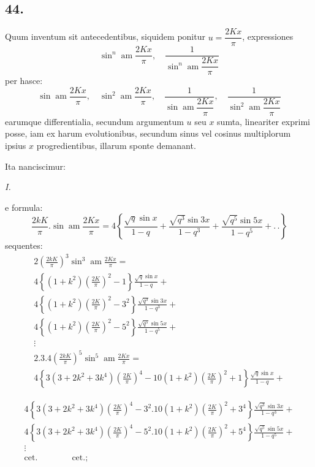 \documentclass{article}
\begin{document}
\subsection*{44.}

Quum inventum sit antecedentibus, siquidem ponitur $u=\dfrac{2Kx}{\pi}$, expressiones
\[
\sin^{n}\operatorname{am}\frac{2Kx}{\pi},\quad\frac{1}{\sin^{n}\operatorname{am}\dfrac{2Kx}{\pi}}
\]
per hasce:
\[
\sin\operatorname{am}\frac{2Kx}{\pi},\quad\sin^{2}\operatorname{am}\frac{2Kx}{\pi},\quad\frac{1}{\sin\operatorname{am}\dfrac{2Kx}{\pi}},\quad\frac{1}{\sin^{2}\operatorname{am}\dfrac{2Kx}{\pi}}
\]
earumque differentialia, secundum argumentum $u$ seu $x$ sumta, lineariter exprimi posse, iam ex harum evolutionibus, secundum sinus vel cosinus multiplorum ipsius $x$ progredientibus, illarum sponte demanant.

Ita nanciscimur:

\emph{I.}

e formula:
\[
\frac{2kK}{\pi}.\sin\operatorname{am}\frac{2Kx}{\pi}=4\left\{\frac{\sqrt{q}\sin x}{1-q}+\frac{\sqrt{q^{3}}\sin 3x}{1-q^{3}}+\frac{\sqrt{q^{5}}\sin 5x}{1-q^{5}}+.\,.\right\}
\]
sequentes:
\[
\begin{gathered}
2\left(\frac{2kK}{\pi}\right)^{3}\sin^{3}\operatorname{am}\frac{2Kx}{\pi}=\\[1.5ex]
4\left\{(1+k^{2})\left(\frac{2K}{\pi}\right)^{2}-1\right\}\frac{\sqrt{q}\sin x}{1-q}+\\[1.5ex]
4\left\{(1+k^{2})\left(\frac{2K}{\pi}\right)^{2}-3^{2}\right\}\frac{\sqrt{q^{3}}\sin 3x}{1-q^{3}}+\\[1.5ex]
4\left\{(1+k^{2})\left(\frac{2K}{\pi}\right)^{2}-5^{2}\right\}\frac{\sqrt{q^{5}}\sin 5x}{1-q^{5}}+\\[1.5ex]
\vdots\\[1.5ex]
2.3.4\left(\frac{2kK}{\pi}\right)^{5}\sin^{5}\operatorname{am}\frac{2Kx}{\pi}=\\[1.5ex]
4\left\{3(3+2k^{2}+3k^{4})\left(\frac{2K}{\pi}\right)^{4}-10(1+k^{2})\left(\frac{2K}{\pi}\right)^{2}+1\right\}\frac{\sqrt{q}\sin x}{1-q}+
\end{gathered}
\]

\[
\begin{gathered}
4\left\{3(3+2k^{2}+3k^{4})\left(\frac{2K}{\pi}\right)^{4}-3^{2}.10(1+k^{2})\left(\frac{2K}{\pi}\right)^{2}+3^{4}\right\}\frac{\sqrt{q^{3}}\sin 3x}{1-q^{3}}+\\[1.5ex]
4\left\{3(3+2k^{2}+3k^{4})\left(\frac{2K}{\pi}\right)^{4}-5^{2}.10(1+k^{2})\left(\frac{2K}{\pi}\right)^{2}+5^{4}\right\}\frac{\sqrt{q^{5}}\sin 5x}{1-q^{5}}+\\[1.5ex]
\vdots\\[1.5ex]
\text{cet.}\qquad\qquad\text{cet.};
\end{gathered}
\]
\end{document}

